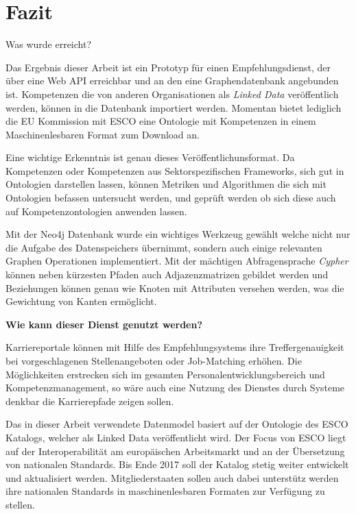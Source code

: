 \section{Fazit}\label{fazit}

Was wurde erreicht?

Das Ergebnis dieser Arbeit ist ein Prototyp für einen Empfehlungsdienst, der über eine Web API erreichbar und an den eine Graphendatenbank angebunden ist. Kompetenzen die von anderen Organisationen als \textit{Linked Data} veröffentlich werden, können in die Datenbank importiert werden. Momentan bietet lediglich die EU Kommission mit ESCO eine Ontologie mit Kompetenzen in einem Maschinenlesbaren Format zum Download an. 

Eine wichtige Erkenntnis ist genau dieses Veröffentlichunsformat. Da Kompetenzen oder Kompetenzen aus Sektorspezifischen Frameworks, sich gut in Ontologien darstellen lassen, können Metriken und Algorithmen die sich mit Ontologien befassen untersucht werden, und geprüft werden ob sich diese auch auf Kompetenzontologien anwenden lassen.

Mit der Neo4j Datenbank wurde ein wichtiges Werkzeug gewählt welche nicht nur die Aufgabe des Datenspeichers übernimmt, sondern auch einige relevanten Graphen Operationen implementiert. Mit der mächtigen Abfragensprache \textit{Cypher} können neben kürzesten Pfaden auch Adjazenzmatrizen gebildet werden und Beziehungen können genau wie Knoten mit Attributen versehen werden, was die Gewichtung von Kanten ermöglicht.


\textbf{Wie kann dieser Dienst genutzt werden? }

Karriereportale können mit Hilfe des Empfehlungsystems ihre Treffergenauigkeit bei vorgeschlagenen Stellenangeboten oder Job-Matching erhöhen. Die Möglichkeiten erstrecken sich im gesamten Personalentwicklungsbereich und Kompetenzmanagement, so wäre auch eine Nutzung des Dienstes durch Systeme denkbar die Karrierepfade zeigen sollen. 
 
Das in dieser Arbeit verwendete Datenmodel basiert auf der Ontologie des ESCO Katalogs, welcher als Linked Data veröffentlicht wird. Der Focus von ESCO liegt auf der Interoperabilität am europäischen Arbeitsmarkt und an der Übersetzung von nationalen Standards. Bis Ende 2017 soll der Katalog stetig weiter entwickelt und aktualisiert werden. Mitgliederstaaten sollen auch dabei unterstütz werden ihre nationalen Standards in maschinenlesbaren Formaten zur Verfügung zu stellen. 

